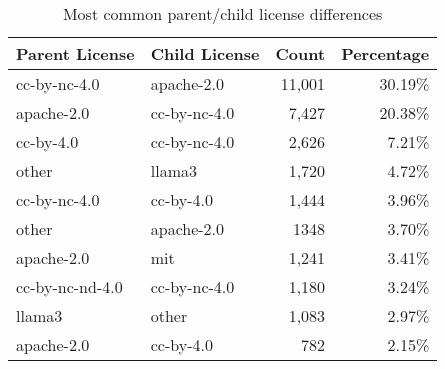 \begin{table}[]
\caption{Most common parent/child license differences}
\label{tab:license_changes}
\begin{tabular}{llrr}
\hline
\textbf{Parent License} & \textbf{Child License} & \textbf{Count }& \textbf{Percentage }\\ \hline
cc-by-nc-4.0 & apache-2.0 & 11,001 & 30.19\% \\
apache-2.0 & cc-by-nc-4.0 & 7,427 & 20.38\% \\
cc-by-4.0 & cc-by-nc-4.0 & 2,626 & 7.21\% \\
other & llama3 & 1,720 & 4.72\% \\
cc-by-nc-4.0 & cc-by-4.0 & 1,444 & 3.96\% \\
other & apache-2.0 & 1348 & 3.70\% \\
apache-2.0 & mit & 1,241 & 3.41\% \\
cc-by-nc-nd-4.0 & cc-by-nc-4.0 & 1,180 & 3.24\% \\
llama3 & other & 1,083 & 2.97\% \\
apache-2.0 & cc-by-4.0 & 782 & 2.15\%\\ \hline
\end{tabular}%
\end{table}
